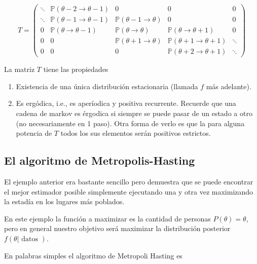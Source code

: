 \documentclass[
  12pt,
]{book}
\providecommand{\tightlist}{%
  \setlength{\itemsep}{0pt}\setlength{\parskip}{0pt}}
\theoremstyle{definition}
\theoremstyle{definition}
\theoremstyle{definition}
\theoremstyle{remark}
\begin{document}
\begin{equation*}
T= \left(\begin{array}{ccccc}
\ddots & \mathbb{P}(\theta-2 \rightarrow \theta-1) & 0 & 0 & 0 \\
\ddots & \mathbb{P}(\theta-1 \rightarrow \theta-1) & \mathbb{P}(\theta-1 \rightarrow \theta) & 0 & 0 \\
0 & \mathbb{P}(\theta \rightarrow \theta-1) & \mathbb{P}(\theta \rightarrow \theta) & \mathbb{P}(\theta \rightarrow \theta+1) & 0 \\
0 & 0 & \mathbb{P}(\theta+1 \rightarrow \theta) & \mathbb{P}(\theta+1 \rightarrow \theta+1) & \ddots \\
0 & 0 & 0 & \mathbb{P}(\theta+2 \rightarrow \theta+1) & \ddots
\end{array}\right)
\end{equation*}

La matriz \(T\) tiene las propiedades

\begin{enumerate}
\def\labelenumi{\arabic{enumi}.}
\tightlist
\item
  Existencia de una única distribución estacionaria (llamada \(f\) más adelante).
\item
  Es ergódica, i.e., es aperíodica y positiva recurrente. Recuerde que una cadena de markov es érgodica si siempre se puede pasar de un estado a otro (no necesariamente en 1 paso). Otra forma de verlo es que la para alguna potencia de \(T\) todos los sus elementos serán positivos estrictos.
\end{enumerate}

\hypertarget{el-algoritmo-de-metropolis-hasting}{%
\subsection{El algoritmo de Metropolis-Hasting}\label{el-algoritmo-de-metropolis-hasting}}

El ejemplo anterior era bastante sencillo pero demuestra que se puede
encontrar el mejor estimador posible simplemente ejecutando una y otra
vez maximizando la estadía en los lugares más poblados.

En este ejemplo la función a maximizar es la cantidad de personas
\(P(\theta)=\theta\), pero en general nuestro objetivo será maximizar
la distribución posterior \(f(\theta| \text{ datos })\).

En palabras simples el algoritmo de Metropoli Hasting es
\end{document}

